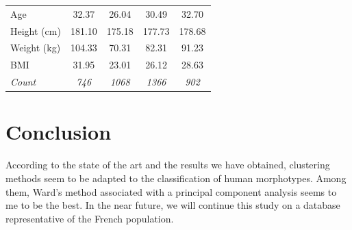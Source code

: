 \documentclass[12pt,a4paper,openany,UKenglish]{scrreprt}
\begin{document}
\begin{table}[H]
\begin{tabular}{lcccc}
		\hline
		Age                          & 32.37                                & 26.04         & 30.49         & 32.70        \\
		Height (cm)                  & 181.10                               & 175.18        & 177.73        & 178.68       \\
		Weight (kg)                  & 104.33                               & 70.31         & 82.31         & 91.23        \\
		BMI                          & 31.95                                & 23.01         & 26.12         & 28.63        \\
		\hline
		\textit{Count}               & \textit{746}                         & \textit{1068} & \textit{1366} & \textit{902}
	\end{tabular}
\end{table}

\section{Conclusion}
According to the state of the art and the results we have obtained, clustering methods seem to be adapted to the classification of human morphotypes. Among them, Ward's method associated with a principal component analysis seems to me to be the best. In the near future, we will continue this study on a database representative of the French population.

\newpage

\end{document}
